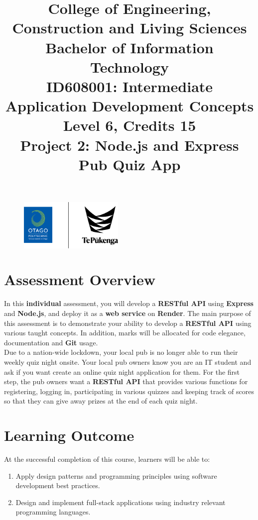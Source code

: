 \documentclass{article}
\author{}
\begin{document}
\begin{figure}
	\centering 
	\includegraphics[width=50mm]{../../resources/img/logo.png}
\end{figure}

\title{College of Engineering, Construction and Living Sciences\\Bachelor of Information Technology\\ID608001: Intermediate Application Development Concepts\\Level 6, Credits 15\\\textbf{Project 2: Node.js and Express Pub Quiz App }}
\date{}
\maketitle

\section*{Assessment Overview}
In this \textbf{individual} assessment, you will develop a \textbf{RESTful API} using \textbf{Express} and \textbf{Node.js}, and deploy it as a \textbf{web service} on \textbf{Render}. The main purpose of this assessment is to demonstrate your ability to develop a \textbf{RESTful API} using various taught concepts. In addition, marks will be allocated for code elegance, documentation and \textbf{Git} usage.\\

Due to a nation-wide lockdown, your local pub is no longer able to run their weekly quiz night onsite. Your local pub owners know you are an IT student and ask if you want create an online quiz night application for them. For the first step, the pub owners want a \textbf{RESTful API} that provides various functions for registering, logging in, participating in various quizzes and keeping track of scores so that they can give away prizes at the end of each quiz night.

\section*{Learning Outcome}
At the successful completion of this course, learners will be able to:
\begin{enumerate}
	\item Apply design patterns and programming principles using software development best practices.
	\item Design and implement full-stack applications using industry relevant programming languages.
\end{enumerate}
\end{document}
